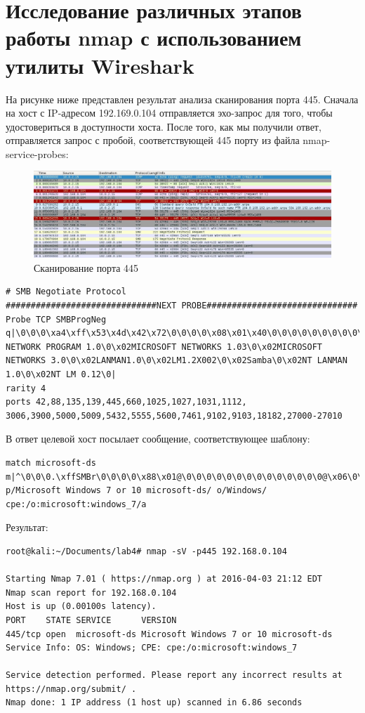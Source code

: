 \documentclass[12pt,a4paper]{report}
\begin{document}
\section*{Исследование различных этапов работы nmap с использованием утилиты Wireshark}


На рисунке ниже представлен результат анализа сканирования порта 445.
Сначала на хост с IP-адресом 192.169.0.104 отправляется эхо-запрос для того, чтобы удостовериться в доступности хоста. После того, как мы получили ответ, отправляется запрос с пробой, соответствующей 445 порту из файла nmap-service-probes:
\begin{figure}[ht!]
\centering
\includegraphics[width=160mm]{res/wireshark.jpg}
\caption{Сканирование порта 445\label{overflow}}
\end{figure}

\begin{lstlisting}[breaklines]
# SMB Negotiate Protocol
##############################NEXT PROBE##############################
Probe TCP SMBProgNeg q|\0\0\0\xa4\xff\x53\x4d\x42\x72\0\0\0\0\x08\x01\x40\0\0\0\0\0\0\0\0\0\0\0\0\0\0\x40\x06\0\0\x01\0\0\x81\0\x02PC NETWORK PROGRAM 1.0\0\x02MICROSOFT NETWORKS 1.03\0\x02MICROSOFT NETWORKS 3.0\0\x02LANMAN1.0\0\x02LM1.2X002\0\x02Samba\0\x02NT LANMAN 1.0\0\x02NT LM 0.12\0|
rarity 4
ports 42,88,135,139,445,660,1025,1027,1031,1112,
3006,3900,5000,5009,5432,5555,5600,7461,9102,9103,18182,27000-27010
\end{lstlisting}


В ответ целевой хост посылает сообщение, соответствующее шаблону: 

\begin{lstlisting}[breaklines]
match microsoft-ds m|^\0\0\0.\xffSMBr\0\0\0\0\x88\x01@\0\0\0\0\0\0\0\0\0\0\0\0\0\0@\x06\0\0\x01\0\x11\x07\0.\n\0\x01\0\x04\x11\0\0\0\0\x01\0\0\0\0\0\xfc\xe3\x01\0|s p/Microsoft Windows 7 or 10 microsoft-ds/ o/Windows/ cpe:/o:microsoft:windows_7/a
\end{lstlisting}
Результат:
\begin{lstlisting}[breaklines]
root@kali:~/Documents/lab4# nmap -sV -p445 192.168.0.104

Starting Nmap 7.01 ( https://nmap.org ) at 2016-04-03 21:12 EDT
Nmap scan report for 192.168.0.104
Host is up (0.00100s latency).
PORT    STATE SERVICE      VERSION
445/tcp open  microsoft-ds Microsoft Windows 7 or 10 microsoft-ds
Service Info: OS: Windows; CPE: cpe:/o:microsoft:windows_7

Service detection performed. Please report any incorrect results at https://nmap.org/submit/ .
Nmap done: 1 IP address (1 host up) scanned in 6.86 seconds
\end{lstlisting}
\end{document}
